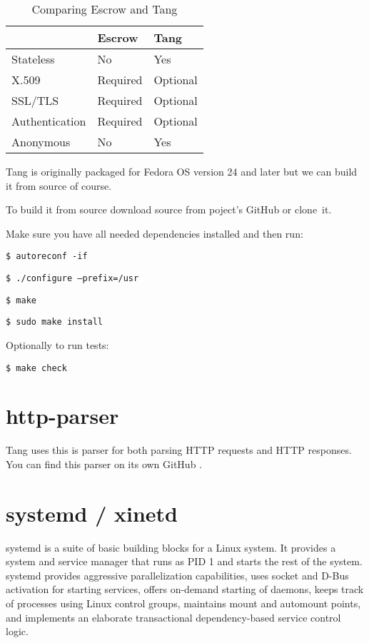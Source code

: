 \documentclass[../xdudla00-porting-Tang-to-Open-WRT.tex]{subfiles}
\begin{document}
\begin{table}[h]
\centering
\label{compare}
\begin{tabular}{@{}lll@{}}
\toprule
               & Escrow   & Tang                         \\ \midrule
Stateless      & No       & Yes                          \\
X.509          & Required & Optional                     \\
SSL/TLS        & Required & Optional                     \\
Authentication & Required & Optional                     \\
Anonymous      & No       & Yes                          \\ \bottomrule
\end{tabular}
\caption{Comparing Escrow and Tang}
\end{table}


Tang is originally packaged for Fedora OS version 24 and later but we can build it from source of course.

To build it from source download source from poject's GitHub or clone~it.

Make sure you have all needed dependencies installed and then run:

{\tt \$ autoreconf -if}

{\tt \$ ./configure --prefix=/usr}

{\tt \$ make}

{\tt \$ sudo make install}

Optionally to run tests:

{\tt \$ make check}

\section{http-parser}\label{parser}
Tang uses this is parser for both parsing HTTP requests and HTTP responses. 
You can find this parser on its own GitHub \cite{http-parser}.

\section{systemd / xinetd}\label{systemd}
systemd \cite{systemd} is a suite of basic building blocks for a Linux system. It provides a system and service manager that runs as PID 1 and starts the rest of the system. systemd provides aggressive parallelization capabilities, uses socket and D-Bus activation for starting services, offers on-demand starting of daemons, keeps track of processes using Linux control groups, maintains mount and automount points, and implements an elaborate transactional dependency-based service control logic.
\end{document}
